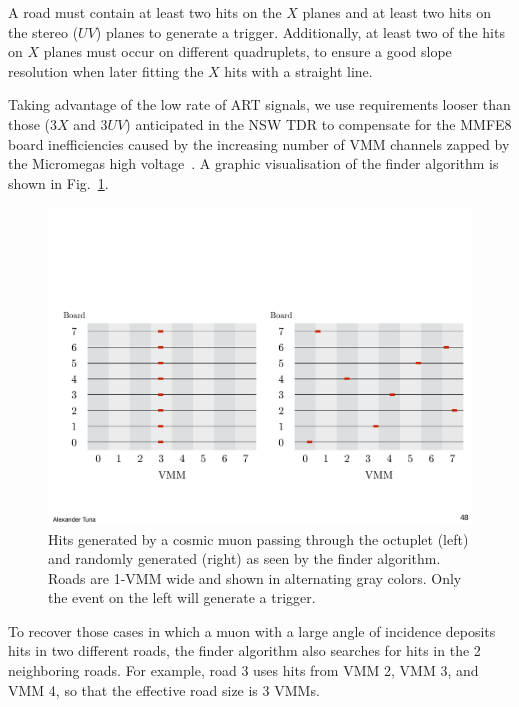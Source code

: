A road must contain at least two hits on the $X$ planes and at least two hits on the stereo ($UV$) planes to generate a trigger.
 Additionally, at least two of the hits on $X$ planes must occur on different quadruplets, to ensure a good slope resolution when
 later  fitting the $X$ hits with a straight line.

 Taking advantage of the low rate of ART signals, we use requirements looser than those ($3X$ and $3UV$)  anticipated in the
  NSW TDR to compensate for the MMFE8 board inefficiencies caused by the increasing number of VMM channels zapped by the
 Micromegas high voltage~\cite{noiseless}.
 A graphic visualisation of the finder algorithm is shown in Fig.~\ref{fig:cartoon_road_demo}.
\begin{figure}[!htpb]
  \begin{center}
    \includegraphics[width=1.0\textwidth]{figures/cartoons/cartoon_road_demo}
  \end{center}
  \vspace{-20pt}
  \caption{Hits generated by a cosmic muon passing through the octuplet (left) and
  randomly generated (right) as seen by the finder algorithm. Roads are 1-VMM wide and shown in alternating gray colors.
 Only the event on the left will generate a trigger.}
  \label{fig:cartoon_road_demo}
\end{figure}
To recover those  cases in which a muon with a large angle of incidence deposits hits in two different roads, 
 the finder algorithm  also searches for  hits  in the 2 neighboring roads. 
 For example, road 3 uses hits from VMM 2, VMM 3, and VMM 4, so that the effective road size is 3 VMMs.


